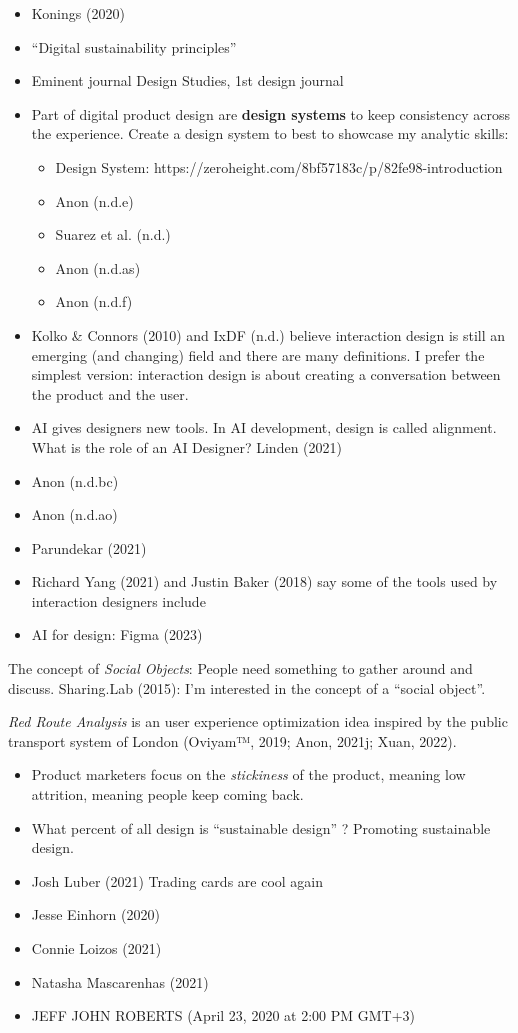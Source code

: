 \documentclass[
  letterpaper,
  DIV=11,
  numbers=noendperiod]{scrartcl}
\providecommand{\tightlist}{%
  \setlength{\itemsep}{0pt}\setlength{\parskip}{0pt}}\usepackage{longtable,booktabs,array}
\begin{document}
\begin{itemize}
\tightlist
\item
  Konings (2020)
\item
  ``Digital sustainability principles''
\item
  Eminent journal Design Studies, 1st design journal
\item
  Part of digital product design are \textbf{design systems} to keep
  consistency across the experience. Create a design system to best to
  showcase my analytic skills:

  \begin{itemize}
  \tightlist
  \item
    Design System:
    https://zeroheight.com/8bf57183c/p/82fe98-introduction
  \item
    Anon (n.d.e)
  \item
    Suarez et al. (n.d.)
  \item
    Anon (n.d.as)
  \item
    Anon (n.d.f)
  \end{itemize}
\item
  Kolko \& Connors (2010) and IxDF (n.d.) believe interaction design is
  still an emerging (and changing) field and there are many definitions.
  I prefer the simplest version: interaction design is about creating a
  conversation between the product and the user.
\item
  AI gives designers new tools. In AI development, design is called
  alignment. What is the role of an AI Designer? Linden (2021)
\item
  Anon (n.d.bc)
\item
  Anon (n.d.ao)
\item
  Parundekar (2021)
\item
  Richard Yang (2021) and Justin Baker (2018) say some of the tools used
  by interaction designers include
\item
  AI for design: Figma (2023)
\end{itemize}

The concept of \emph{Social Objects}: People need something to gather
around and discuss. Sharing.Lab (2015): I'm interested in the concept of
a ``social object''.

\emph{Red Route Analysis} is an user experience optimization idea
inspired by the public transport system of London (Oviyam™, 2019; Anon,
2021j; Xuan, 2022).

\begin{itemize}
\tightlist
\item
  Product marketers focus on the \emph{stickiness} of the product,
  meaning low attrition, meaning people keep coming back.
\item
  What percent of all design is ``sustainable design'' ? Promoting
  sustainable design.
\item
  Josh Luber (2021) Trading cards are cool again
\item
  Jesse Einhorn (2020)
\item
  Connie Loizos (2021)
\item
  Natasha Mascarenhas (2021)
\item
  JEFF JOHN ROBERTS (April 23, 2020 at 2:00 PM GMT+3)
\end{itemize}
\end{document}
